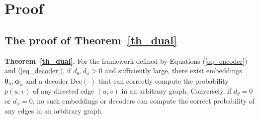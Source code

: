 
\hypertarget{app:proof}{} 
\section{Proof}\label{app_proof}

\hypertarget{app_proof_th_dual}{} 
\subsection{The proof of Theorem~\ref{th_dual}}\label{app_proof_th_dual}

\textbf{Theorem~\ref{th_dual}.}
For the framework defined by Equations (\ref{eq_encoder}) and (\ref{eq_decoder}), if ${d_{\theta}}, {d_{\phi}} > 0$ and sufficiently large, there exist embeddings ${\bm \theta}_u, {\bm \phi}_u$ and a decoder $\mathrm{Dec}(\cdot)$ that can correctly compute the probability $p(u,v)$ of any directed edge $(u,v)$ in an arbitrary graph. Conversely, if ${d_{\theta}} = 0$ or ${d_{\phi}} = 0$, no such embeddings or decoders can compute the correct probability of any edges in an arbitrary graph.
